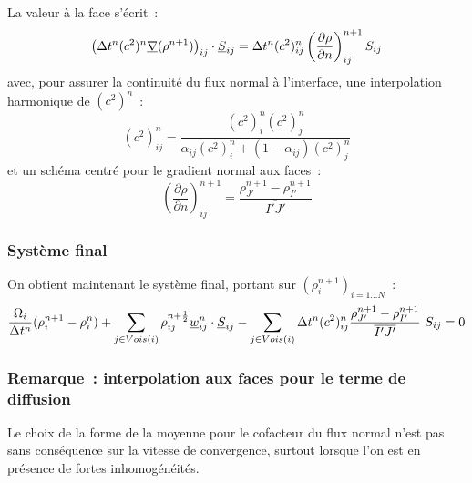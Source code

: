 La valeur \`a la face s'\'ecrit~:
\begin{equation}
\left(\Delta t^n (c^2)^n \underline{\nabla}(\rho^{n+1})\right)_{ij}\cdot \underline{S}_{ij}
= \Delta t^n (c^2)^n_{ij}
\displaystyle \left( \frac{\partial \rho}{\partial n} \right)^{n+1}_{ij}S_{ij}
\end{equation}
avec, pour assurer la continuit\'e du flux normal \`a l'interface,
une interpolation harmonique de $(c^2)^n$~:
\begin{equation}\label{Cfbl_Cfmsvl_eq_harmonique_cfmsvl}
\displaystyle(c^2)_{ij}^n
= \frac{(c^2)_{i}^n (c^2)_{j}^n}
{\alpha_{ij}(c^2)_{i}^n+(1-\alpha_{ij})(c^2)_{j}^n}
\end{equation}
et un sch\'ema centr\'e pour le gradient normal aux faces~:
\begin{equation}
\displaystyle \left( \frac{\partial \rho}{\partial n} \right)^{n+1}_{ij}
= \displaystyle\frac{\rho_{J'}^{n+1}-\rho_{I'}^{n+1}}{\overline{I'J'}}
\end{equation}

\subsubsection*{Syst\`eme final}

On obtient maintenant le syst\`eme final, portant sur
$(\rho_i^{n+1})_{i=1 \ldots N}$~:
\begin{equation}\label{Cfbl_Cfmsvl_eq_densite_finale_cfmsvl}
\displaystyle\frac{\Omega_i}{\Delta t^n} (\rho_i^{n+1}-\rho_i^n)
+\sum\limits_{j\in Vois(i)}\rho_{ij}^{n+\frac{1}{2}}
\vect{w}_{ij}^n \cdot \vect{S}_{ij}
-\sum\limits_{j\in Vois(i)} \Delta t^n (c^2)_{ij}^n
\displaystyle\frac{\rho_{J'}^{n+1}-\rho_{I'}^{n+1}}{\overline{I'J'}}\ S_{ij}
= 0
\end{equation}



\subsubsection*{Remarque~: interpolation aux faces pour le terme de diffusion}

Le choix de la forme de la moyenne pour le cofacteur du flux
normal n'est pas sans cons\'equence sur la vitesse de convergence, surtout
lorsque l'on est en pr\'esence de fortes inhomog\'en\'eit\'es.

